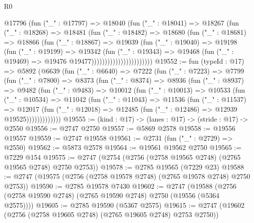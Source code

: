 \begin{lexlean}{R0}
\begin{coremodule}
                            @17796
                              (fun ("_" : @17797) =>
                              @18040
                                (fun ("_" : @18041) =>
                                @18267
                                  (fun ("_" : @18268) =>
                                  @18481
                                    (fun ("_" : @18482) =>
                                    @18680
                                      (fun ("_" : @18681) =>
                                      @18866
                                        (fun ("_" : @18867) =>
                                        @19039
                                          (fun ("_" : @19040) =>
                                          @19198
                                            (fun ("_" : @19199) =>
                                            @19342
                                              (fun ("_" : @19343) =>
                                              @19468
                                                (fun ("_" : @19469) =>
                                                @19476 @19477)))))))))))))))))))))))
@19552 := fun (typeId : @17) =>
  @5892
    (@6639
      (fun ("_" : @6640) =>
      @7222
        (fun ("_" : @7223) =>
        @7799
          (fun ("_" : @7800) =>
          @8373
            (fun ("_" : @8374) =>
            @8936
              (fun ("_" : @8937) =>
              @9482
                (fun ("_" : @9483) =>
                @10012
                  (fun ("_" : @10013) =>
                  @10533
                    (fun ("_" : @10534) =>
                    @11042
                      (fun ("_" : @11043) =>
                      @11536
                        (fun ("_" : @11537) =>
                        @12017
                          (fun ("_" : @12018) =>
                          @12485 (fun ("_" : @12486) => @12939 @19525)))))))))))))
@19555 := (kind : @17) -> (lanes : @17) -> (stride : @17) -> @2550
@19556 := @2747 @2750
@19557 := @5869 @2578
@19558 := @19556 @19557
@19559 := @2747 @19558
@19561 := @2731 (fun ("_" : @2729) => @2550)
@19562 := @5873 @2578
@19564 := @19561 @19562 @2750
@19565 := @7229 @154
@19575 := @2747 (@2754 (@2756 (@2758 @19565 @2748) (@2765 @19565 @2748) @2750 @2753))
@19578 := @2785 @19565 (@7229 @23)
@19588 := @2747 (@19575 (@2756 (@2758 @19578 @2748) (@2765 @19578 @2748) @2750 @2753))
@19590 := @2785 @19578 @7430
@19602 := @2747
    (@19588 (@2756 (@2758 @19590 @2748) (@2765 @19590 @2748) @2750 (@19556 (@5364 @2575))))
@19605 := @2785 @19590 (@5367 @2575)
@19615 := @2747 (@19602 (@2756 (@2758 @19605 @2748) (@2765 @19605 @2748) @2753 @2750))

\end{coremodule}
\end{lexlean}
